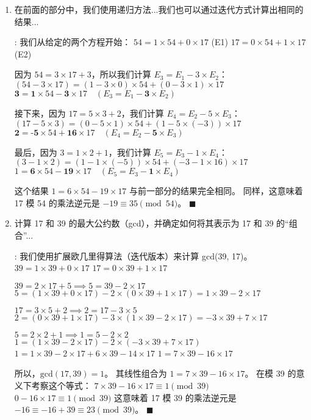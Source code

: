 \documentclass[11pt]{article}
\newenvironment{qparts}{\begin{enumerate}[{(}a{)}]}{\end{enumerate}}
\def\endproofmark{$\blacksquare$}
\newenvironment{proof}{\par\noindent{\bf 解答}:}{\endproofmark\smallskip}
\begin{document}
\begin{qparts}
\begin{proof}
最终我们得到 $1 = 6 \times 54 - 19 \times 17$。

根据 (a) 部分的结论，我们知道在这种情况下 $b = -19$ 是 17 模 54 的乘法逆元。
所以，$17^{-1} \equiv -19 \equiv -19 + 54 \equiv 35 \pmod{54}$。
\end{proof}

\item 在前面的部分中，我们使用递归方法...我们也可以通过迭代方式计算出相同的结果...
\begin{proof}
我们从给定的两个方程开始：
$54=1\times54+0\times17$ (E1)
$17=0\times54+1\times17$ (E2)

因为 $54 = 3 \times 17 + 3$，所以我们计算 $E_3 = E_1 - 3 \times E_2$：
$(54 - 3 \times 17) = (1 - 3 \times 0) \times 54 + (0 - 3 \times 1) \times 17$
$\textbf{3} = \textbf{1} \times 54 - \textbf{3} \times 17 \quad (E_{3}=E_{1}- \textbf{3} \times E_{2})$

接下来，因为 $17 = 5 \times 3 + 2$，我们计算 $E_4 = E_2 - 5 \times E_3$：
$(17 - 5 \times 3) = (0 - 5 \times 1) \times 54 + (1 - 5 \times (-3)) \times 17$
$\textbf{2} = \textbf{-5} \times 54 + \textbf{16} \times 17 \quad (E_{4}=E_{2}- \textbf{5} \times E_{3})$

最后，因为 $3 = 1 \times 2 + 1$，我们计算 $E_5 = E_3 - 1 \times E_4$：
$(3 - 1 \times 2) = (1 - 1 \times (-5)) \times 54 + (-3 - 1 \times 16) \times 17$
$1 = \textbf{6} \times 54 - \textbf{19} \times 17 \quad (E_{5}=E_{3}- \textbf{1} \times E_{4})$

这个结果 $1 = 6 \times 54 - 19 \times 17$ 与前一部分的结果完全相同。
同样，这意味着 17 模 54 的乘法逆元是 $-19 \equiv 35 \pmod{54}$。
\end{proof}

\item 计算 17 和 39 的最大公约数（gcd），并确定如何将其表示为 17 和 39 的“组合”...
\begin{proof}
我们使用扩展欧几里得算法（迭代版本）来计算 gcd(39, 17)。
$39 = 1 \times 39 + 0 \times 17$
$17 = 0 \times 39 + 1 \times 17$

$39 = 2 \times 17 + 5 \implies 5 = 39 - 2 \times 17$
$5 = (1 \times 39 + 0 \times 17) - 2 \times (0 \times 39 + 1 \times 17) = 1 \times 39 - 2 \times 17$

$17 = 3 \times 5 + 2 \implies 2 = 17 - 3 \times 5$
$2 = (0 \times 39 + 1 \times 17) - 3 \times (1 \times 39 - 2 \times 17) = -3 \times 39 + 7 \times 17$

$5 = 2 \times 2 + 1 \implies 1 = 5 - 2 \times 2$
$1 = (1 \times 39 - 2 \times 17) - 2 \times (-3 \times 39 + 7 \times 17)$
$1 = 1 \times 39 - 2 \times 17 + 6 \times 39 - 14 \times 17$
$1 = 7 \times 39 - 16 \times 17$

所以，$\text{gcd}(17, 39) = 1$。
其线性组合为 $1 = 7 \times 39 - 16 \times 17$。
在模 39 的意义下考察这个等式：
$7 \times 39 - 16 \times 17 \equiv 1 \pmod{39}$
$0 - 16 \times 17 \equiv 1 \pmod{39}$
这意味着 17 模 39 的乘法逆元是 $-16 \equiv -16 + 39 \equiv 23 \pmod{39}$。
\end{proof}
\end{qparts}
\end{document}
